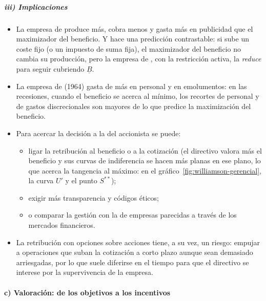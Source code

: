 \documentclass[11pt]{article}
\begin{document}
\subparagraph{iii) Implicaciones}

\begin{itemize}
\item La empresa de  produce más, cobra menos y gasta más en publicidad que el maximizador del beneficio. Y hace una predicción contrastable: si sube un coste fijo (o un impuesto de suma fija), el maximizador del beneficio no cambia su producción, pero la empresa de , con la restricción activa, la \emph{reduce} para seguir cubriendo $\underline{B}$.
\item La empresa de  (1964) gasta de más en personal y en emolumentos: en las recesiones, cuando el beneficio se acerca al mínimo, los recortes de personal y de gastos discrecionales son mayores de lo que predice la maximización del beneficio.
\item Para acercar la decisión a la del accionista se puede:
  \begin{itemize}
  \item ligar la retribución al beneficio o a la cotización (el directivo valora más el beneficio y sus curvas de indiferencia se hacen más planas en ese plano, lo que acerca la tangencia al máximo: en el gráfico~\ref{fig:williamson-gerencial}, la curva $U'$ y el punto $S^{**}$);
  \item exigir más transparencia y códigos éticos;
  \item o comparar la gestión con la de empresas parecidas a través de los mercados financieros.
  \end{itemize}
\item La retribución con opciones sobre acciones tiene, a su vez, un riesgo: empujar a operaciones que suban la cotización a corto plazo aunque sean demasiado arriesgadas, por lo que suele diferirse en el tiempo para que el directivo se interese por la supervivencia de la empresa.
\end{itemize}

\paragraph{c) Valoración: de los objetivos a los incentivos}
\end{document}
